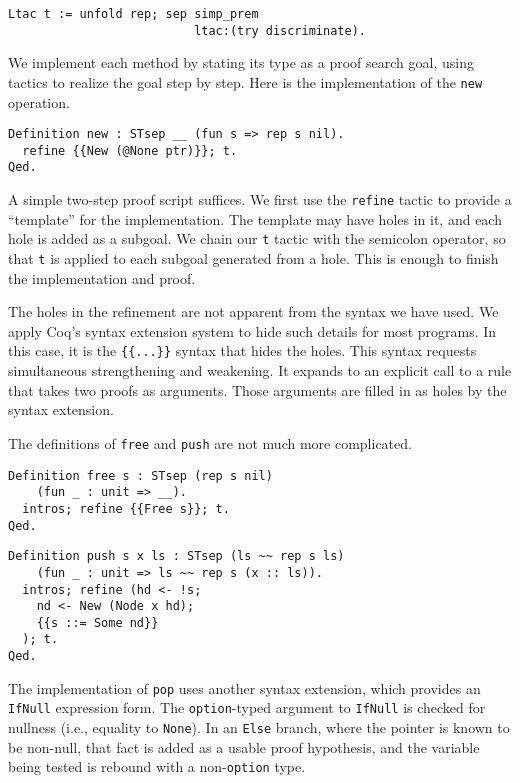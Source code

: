 \documentclass[preprint,nocopyrightspace]{sigplanconf}
\newcommand{\cd}[1]{\texttt{#1}}
\begin{document}
\begin{verbatim}
Ltac t := unfold rep; sep simp_prem
                          ltac:(try discriminate).
\end{verbatim}

We implement each method by stating its type as a proof search goal, using tactics to realize the goal step by step.  Here is the implementation of the \cd{new} operation.

\begin{verbatim}
Definition new : STsep __ (fun s => rep s nil).
  refine {{New (@None ptr)}}; t.
Qed.
\end{verbatim}

A simple two-step proof script suffices.  We first use the \cd{refine} tactic to provide a ``template'' for the implementation.  The template may have holes in it, and each hole is added as a subgoal.  We chain our \cd{t} tactic with the semicolon operator, so that \cd{t} is applied to each subgoal generated from a hole.  This is enough to finish the implementation and proof.

The holes in the refinement are not apparent from the syntax we have used.  We apply Coq's syntax extension system to hide such details for most programs.  In this case, it is the \cd{\{\{...\}\}} syntax that hides the holes.  This syntax requests simultaneous strengthening and weakening.  It expands to an explicit call to a rule that takes two proofs as arguments.  Those arguments are filled in as holes by the syntax extension.

The definitions of \cd{free} and \cd{push} are not much more complicated.

\begin{verbatim}
Definition free s : STsep (rep s nil)
    (fun _ : unit => __).
  intros; refine {{Free s}}; t.
Qed.
\end{verbatim}

\begin{verbatim}
Definition push s x ls : STsep (ls ~~ rep s ls)
    (fun _ : unit => ls ~~ rep s (x :: ls)).
  intros; refine (hd <- !s;
    nd <- New (Node x hd);
    {{s ::= Some nd}}
  ); t.
Qed.
\end{verbatim}

The implementation of \cd{pop} uses another syntax extension, which provides an \cd{IfNull} expression form.  The \cd{option}-typed argument to \cd{IfNull} is checked for nullness (i.e., equality to \cd{None}).  In an \cd{Else} branch, where the pointer is known to be non-null, that fact is added as a usable proof hypothesis, and the variable being tested is rebound with a non-\cd{option} type.
\end{document}
